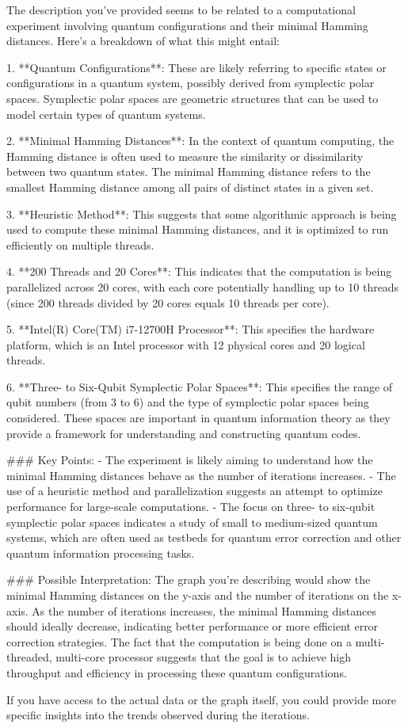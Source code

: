 The description you've provided seems to be related to a computational experiment involving quantum configurations and their minimal Hamming distances. Here's a breakdown of what this might entail:

1. **Quantum Configurations**: These are likely referring to specific states or configurations in a quantum system, possibly derived from symplectic polar spaces. Symplectic polar spaces are geometric structures that can be used to model certain types of quantum systems.

2. **Minimal Hamming Distances**: In the context of quantum computing, the Hamming distance is often used to measure the similarity or dissimilarity between two quantum states. The minimal Hamming distance refers to the smallest Hamming distance among all pairs of distinct states in a given set.

3. **Heuristic Method**: This suggests that some algorithmic approach is being used to compute these minimal Hamming distances, and it is optimized to run efficiently on multiple threads.

4. **200 Threads and 20 Cores**: This indicates that the computation is being parallelized across 20 cores, with each core potentially handling up to 10 threads (since 200 threads divided by 20 cores equals 10 threads per core).

5. **Intel(R) Core(TM) i7-12700H Processor**: This specifies the hardware platform, which is an Intel processor with 12 physical cores and 20 logical threads.

6. **Three- to Six-Qubit Symplectic Polar Spaces**: This specifies the range of qubit numbers (from 3 to 6) and the type of symplectic polar spaces being considered. These spaces are important in quantum information theory as they provide a framework for understanding and constructing quantum codes.

### Key Points:
- The experiment is likely aiming to understand how the minimal Hamming distances behave as the number of iterations increases.
- The use of a heuristic method and parallelization suggests an attempt to optimize performance for large-scale computations.
- The focus on three- to six-qubit symplectic polar spaces indicates a study of small to medium-sized quantum systems, which are often used as testbeds for quantum error correction and other quantum information processing tasks.

### Possible Interpretation:
The graph you're describing would show the minimal Hamming distances on the y-axis and the number of iterations on the x-axis. As the number of iterations increases, the minimal Hamming distances should ideally decrease, indicating better performance or more efficient error correction strategies. The fact that the computation is being done on a multi-threaded, multi-core processor suggests that the goal is to achieve high throughput and efficiency in processing these quantum configurations.

If you have access to the actual data or the graph itself, you could provide more specific insights into the trends observed during the iterations.